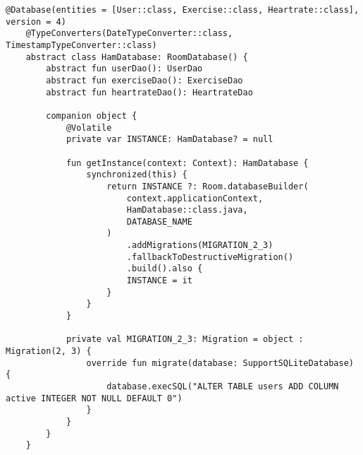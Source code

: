 \begin{lstlisting}[caption={Room Database Configuration (Kotlin)}]
@Database(entities = [User::class, Exercise::class, Heartrate::class], version = 4)
    @TypeConverters(DateTypeConverter::class, TimestampTypeConverter::class)
    abstract class HamDatabase: RoomDatabase() {
        abstract fun userDao(): UserDao
        abstract fun exerciseDao(): ExerciseDao
        abstract fun heartrateDao(): HeartrateDao
    
        companion object {
            @Volatile
            private var INSTANCE: HamDatabase? = null
    
            fun getInstance(context: Context): HamDatabase {
                synchronized(this) {
                    return INSTANCE ?: Room.databaseBuilder(
                        context.applicationContext,
                        HamDatabase::class.java,
                        DATABASE_NAME
                    )
                        .addMigrations(MIGRATION_2_3)
                        .fallbackToDestructiveMigration()
                        .build().also {
                        INSTANCE = it
                    }
                }
            }
    
            private val MIGRATION_2_3: Migration = object : Migration(2, 3) {
                override fun migrate(database: SupportSQLiteDatabase) {
                    database.execSQL("ALTER TABLE users ADD COLUMN active INTEGER NOT NULL DEFAULT 0")
                }
            }
        }
    }
          
\end{lstlisting}
